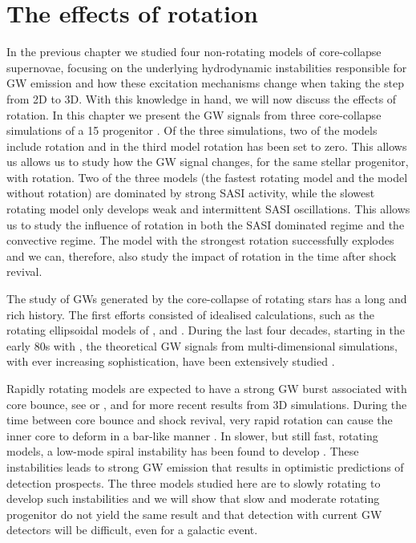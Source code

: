 \chapter{The effects of rotation} \label{ch:paper2}
In the previous chapter we studied four non-rotating models of core-collapse
supernovae, focusing on the underlying hydrodynamic instabilities responsible
for GW emission and how these excitation mechanisms change when taking the step from
2D to 3D. With this knowledge in hand, we will now discuss the effects of rotation.
In this chapter we present the GW signals from three core-collapse simulations of a 15 \msun  
progenitor \citep{heger_05}. Of the three simulations, two of the models include rotation
and in the third model rotation has been set to zero. This allows us allows us to study
how the GW signal changes, for the same stellar progenitor, with rotation.
Two of the three models (the fastest rotating model and the model without rotation)
are dominated by strong SASI activity, while the slowest rotating model only develops weak and intermittent SASI oscillations. 
This allows us to study the influence of rotation in both the SASI dominated regime and the convective regime. The model with the strongest
rotation successfully explodes and we can, therefore, also study the impact of rotation in the time after shock revival.

The study of GWs generated by the core-collapse of rotating stars
has a long and rich history. The first efforts consisted of idealised calculations, 
such as the rotating ellipsoidal models of \cite{thuan_74,novikov_76,shapiro_77,saenz_78,saenz_79}, and \cite{saenz_81}.
During the last four decades, starting in the early 80s with \cite{mueller_82}, the theoretical GW signals from multi-dimensional
simulations, with ever increasing sophistication, have been extensively studied 
\citep{mueller_82,finn_90,moenchmeyer_91,yamada_95,zwerger_97,rampp_98,dimmelmeier_01,dimmelmeier_phd,
dimmelmeier_02_b,kotake_03,ott_04,yamada_04,shibata_04,cerda_05,saijo_05,ott_05,shibata_05,kotake_06,
obergaulinger_06b,ott_phd,dimmelmeier_07_a,dimmelmeier_07_bb,dimmelmeier_08,reisswig_11,
takiwaki_11,ott_12,kuroda_14,fuller_15}.

Rapidly rotating models are expected to have a strong GW burst associated with core bounce, 
see \cite{mueller_82} or  \cite{kuroda_14}, and \cite{fuller_15} for more recent results from 3D simulations.
During the time between core bounce and shock revival, very rapid rotation can cause
the inner core to deform in a bar-like manner \citep{rampp_98,shibata_05}.
In slower, but still fast, rotating models, 
a low-mode spiral instability has been found to develop 
\citep{ott_05,kuroda_14,takiwaki_16}. These instabilities leads to strong
GW emission that results in optimistic predictions of detection prospects.
The three models studied here are to slowly rotating to develop such instabilities 
and we will show that slow and moderate rotating progenitor do not yield the same
result and that detection with current GW detectors will be difficult, even for a
galactic event.

